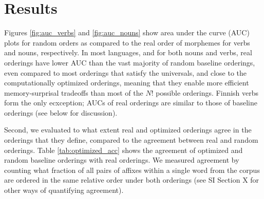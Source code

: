 \documentclass[11pt,letterpaper]{article}
\newcommand{\citet}{\Textcite}
\newcommand\becky[1]{{\color{blue}(#1)}}
\newcounter{def}
\begin{document}



\section{Results}

Figures \ref{fig:auc_verbs} and \ref{fig:auc_nouns} show area under the curve (AUC) plots for random orders as compared to the real order of morphemes for verbs and nouns, respectively.
In most languages, and for both nouns and verbs, real orderings have lower AUC than the vast majority of random baseline orderings, even compared to most orderings that satisfy the universals, and close to the computationally optimized orderings, meaning that they enable more efficient memory-surprisal tradeoffs than most of the $N!$ possible orderings.
Finnish verbs form the only ecxception; AUCs of real orderings are similar to those of baseline orderings (see below for discussion).

Second, we evaluated to what extent real and optimized orderings agree in the orderings that they define, compared to the agreement between real and random orderings.
Table \ref{tab:optimized_acc} shows the agreement of optimized and random baseline orderings with real orderings.
We measured agreement by counting what fraction of all pairs of affixes within a single word from the corpus are ordered in the same relative order under both orderings (see SI Section X for other ways of quantifying agreement).
\end{document}
